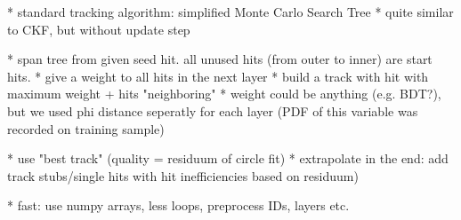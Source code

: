 * standard tracking algorithm: simplified Monte Carlo Search Tree
* quite similar to CKF, but without update step

* span tree from given seed hit. all unused hits (from outer to inner) are start hits.
  * give a weight to all hits in the next layer
  * build a track with hit with maximum weight + hits "neighboring"
  * weight could be anything (e.g. BDT?), but we used phi distance seperatly for each layer (PDF of this variable was recorded on training sample)

* use "best track" (quality = residuum of circle fit)
* extrapolate in the end: add track stubs/single hits with hit inefficiencies based on residuum)

* fast: use numpy arrays, less loops, preprocess IDs, layers etc.

